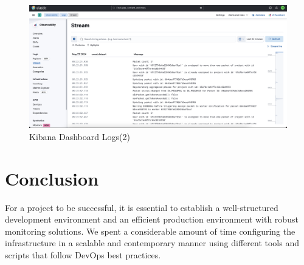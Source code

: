 \begin{figure}[H]
  \centering
  \includegraphics[width=1\textwidth]{src/assets/chapters/kibanalogs2.png}
  \caption{Kibana Dashboard Logs(2)}
  \label{fig:kibana-dash-logs-2}
\end{figure}



\section{Conclusion}

For a project to be successful, it is essential to establish a well-structured development environment and an efficient production environment with robust monitoring solutions. We spent a considerable amount of time configuring the infrastructure in a scalable and contemporary manner using different tools and scripts that follow DevOps best practices.